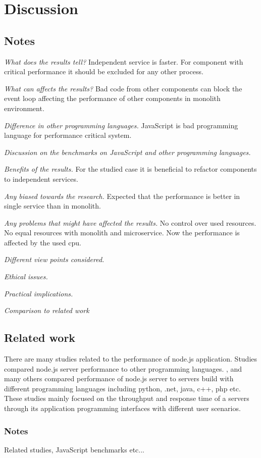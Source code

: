 \chapter{Discussion\label{discussion}}
\section{Notes}
\textit{What does the results tell?}
Independent service is faster.
For component with critical performance it should be excluded for any other process.

\textit{What can affects the results?}
Bad code from other components can block the event loop affecting the performance of other components in monolith environment.

\textit{Difference in other programming languages.}
JavaScript is bad programming language for performance critical system.

\textit{Discussion on the benchmarks on JavaScript and other programming languages.}

\textit{Benefits of the results.}
For the studied case it is beneficial to refactor components to independent services.

\textit{Any biased towards the research.}
Expected that the performance is better in single service than in monolith.

\textit{Any problems that might have affected the results.}
No control over used resources. No equal resources with monolith and microservice. Now the performance is affected by the used cpu.

\textit{Different view points considered.}

\textit{Ethical issues.}

\textit{Practical implications.}

\textit{Comparison to related work}


\section{Related work}
There are many studies related to the performance of node.js application.
Studies compared node.js server performance to other programming languages.
\cite{Challapalli}, \cite{Lion} and many others compared performance of node.js server to servers build with different programming languages including python, .net, java, c++, php etc.
These studies mainly focused on the throughput and response time of a servers through its application programming interfaces with different user scenarios.
\subsection{Notes}
Related studies, JavaScript benchmarks etc...

